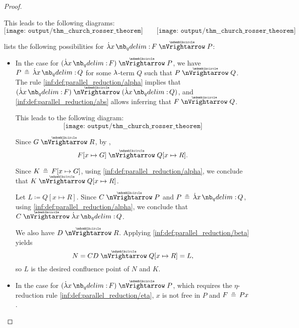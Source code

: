 \begin{proof}
\begin{itemize}
\begin{itemize}
      This leads to the following diagrams:
      \begin{equation*}
        \texttt{[image: output/thm\_\_church\_rosser\_theorem]}
        \quad\quad
        \texttt{[image: output/thm\_\_church\_rosser\_theorem]}
      \end{equation*}

       lists the following possibilities for \( \qabs x F \ppred P \):
      \begin{itemize}
        \item In the case  for \( (\qabs x F) \ppred P \), we have \( P \aequiv \qabs x Q \) for some \( {\mathrm \lambda} \)-term \( Q \) such that \( P \ppred Q \). The rule \ref{inf:def:parallel_reduction/alpha} implies that \( (\qabs x F) \ppred (\qabs x Q) \), and \ref{inf:def:parallel_reduction/abs} allows inferring that \( F \ppred Q \).

        This leads to the following diagram:
        \begin{equation*}
          \texttt{[image: output/thm\_\_church\_rosser\_theorem]}
        \end{equation*}

        Since \( G \ppred R \), by ,
        \begin{equation*}
          F[x \mapsto G] \ppred Q[x \mapsto R].
        \end{equation*}

        Since \( K \aequiv F[x \mapsto G] \), using \ref{inf:def:parallel_reduction/alpha}, we conclude that \( K \ppred Q[x \mapsto R] \).

        Let \( L \coloneqq Q[x \mapsto R] \). Since \( C \ppred P \) and \( P \aequiv \qabs x Q \), using \ref{inf:def:parallel_reduction/alpha}, we conclude that \( C \ppred \qabs x Q \).

        We also have \( D \ppred R \). Applying \ref{inf:def:parallel_reduction/beta} yields
        \begin{equation*}
          N = CD \ppred Q[x \mapsto R] = L,
        \end{equation*}
        so \( L \) is the desired confluence point of \( N \) and \( K \).

        \item In the case  for \( (\qabs x F) \ppred P \), which requires the \( \eta \)-reduction rule \ref{inf:def:parallel_reduction/eta}, \( x \) is not free in \( P \) and \( F \aequiv Px \).


\end{itemize}
\end{itemize}
\end{itemize}
\end{proof}
